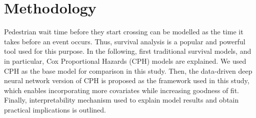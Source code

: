 \section{Methodology}
\label{S:meth}
Pedestrian wait time before they start crossing can be modelled as the time it takes before an event occurs. Thus, survival analysis is a popular and powerful tool used for this purpose. In the following, first traditional survival models, and in particular, Cox Proportional Hazards (CPH) models are explained. We used CPH as the base model for comparison in this study. Then, the data-driven deep neural network version of CPH is proposed as the framework used in this study, which enables incorporating more covariates while increasing goodness of fit. Finally, interpretability mechanism used to explain model results and obtain practical implications is outlined.
